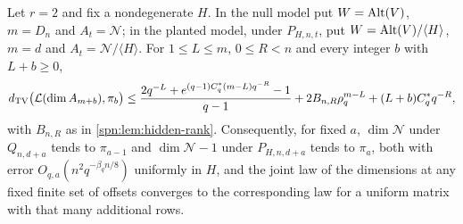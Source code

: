 \begin{proposition}\label{spn:prop:hidden-nullity}
Let $r=2$ and fix a nondegenerate $H$. In the null model put $W=\operatorname{Alt}(V)$, $m=D_n$ and
$A_t=\mathcal N$; in the planted model, under $P_{H,n,t}$, put $W=\operatorname{Alt}(V)/\langle H\rangle$, $m=d$
and $A_t=\mathcal N/\langle H\rangle$. For $1\le L\le m$, $0\le R<n$ and every integer $b$ with
$L+b\ge0$,
\begin{equation}\label{spn:eq:hidden-nullity-finite}
 d_{\mathrm{TV}}\bigl(\mathcal L(\dim A_{m+b}),\pi_b\bigr)\le
 \frac{2q^{-L}+e^{(q-1)C^\ast_q(m-L)q^{-R}}-1}{q-1}+2B_{n,R}\rho_q^{m-L}+(L+b)C^\ast_qq^{-R},
\end{equation}
with $B_{n,R}$ as in \cref{spn:lem:hidden-rank}. Consequently, for fixed $a$, $\dim\mathcal N$ under
$Q_{n,d+a}$ tends to $\pi_{a-1}$ and $\dim\mathcal N-1$ under $P_{H,n,d+a}$ tends to $\pi_a$, both
with error $O_{q,a}(n^2q^{-\beta_qn/8})$ uniformly in $H$, and the joint law of the dimensions at any
fixed finite set of offsets converges to the corresponding law for a uniform matrix with that many
additional rows.
\end{proposition}

